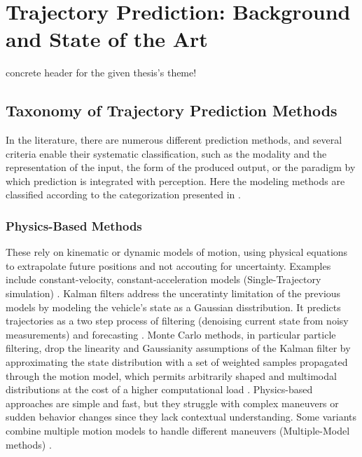 \chapter{Trajectory Prediction: Background and State of the Art}
\label{chapter:sota}

concrete header for the given thesis's theme!


\section{Taxonomy of Trajectory Prediction Methods}
\label{sec:sota-taxonomy}

In the literature, there are numerous different prediction methods, and several criteria enable their
systematic classification, such as the modality and the representation of the input, the form of the
produced output, or the paradigm by which prediction is integrated with perception. Here the modeling
methods are classified according to the categorization presented in \cite{madjid2025survey}.

\subsection{Physics-Based Methods}
\label{subsec:sota-physics}

These rely on kinematic or dynamic models of motion, using physical equations to extrapolate
future positions and not accouting for uncertainty. Examples include constant-velocity, constant-acceleration models 
(Single-Trajectory simulation) \cite{Lin2000VehicleDynamics} \cite{Miller2002Collision}. 
Kalman filters address the unceratinty limitation of the previous models by modeling the vehicle's state as
a Gaussian disstribution. It predicts trajectories as a two step process of filtering (denoising current
state from noisy measurements) and forecasting \cite{Kalman1960}. Monte Carlo methods, in particular
particle filtering, drop the linearity and Gaussianity assumptions of the Kalman filter by approximating
the state distribution with a set of weighted samples propagated through the motion model, which permits
arbitrarily shaped and multimodal distributions at the cost of a higher computational load
\cite{Gordon1993Bootstrap}. Physics-based approaches are simple and fast,
but they struggle with complex maneuvers or sudden behavior changes since they lack contextual
understanding. Some variants combine multiple motion models to handle different maneuvers
(Multiple-Model methods) \cite{Li2005MultipleModel}.

